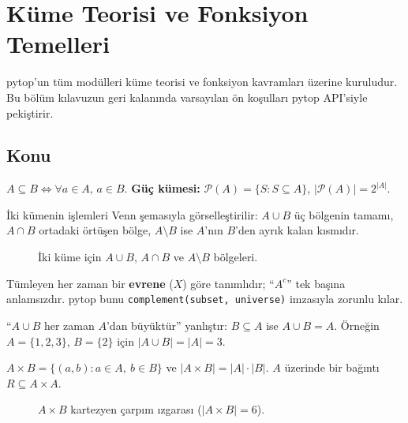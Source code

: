 \chapter{Küme Teorisi ve Fonksiyon Temelleri}

pytop'un tüm modülleri küme teorisi ve fonksiyon kavramları üzerine kuruludur.
Bu bölüm kılavuzun geri kalanında varsayılan ön koşulları pytop API'siyle pekiştirir.

\section{Konu}

\begin{definition}
$A \subseteq B \Longleftrightarrow \forall a \in A,\, a \in B$.
\textbf{Güç kümesi:} $\mathcal{P}(A) = \{S : S \subseteq A\}$,\quad
$|\mathcal{P}(A)| = 2^{|A|}$.
\end{definition}

İki kümenin işlemleri Venn şemasıyla görselleştirilir: $A\cup B$ üç bölgenin
tamamı, $A\cap B$ ortadaki örtüşen bölge, $A\setminus B$ ise $A$'nın $B$'den
ayrık kalan kısmıdır.

\begin{figure}[ht]
\centering

\caption{İki küme için $A\cup B$, $A\cap B$ ve $A\setminus B$ bölgeleri.}
\end{figure}

\begin{sezgi}
Tümleyen her zaman bir \textbf{evrene} ($X$) göre tanımlıdır; ``$A^c$'' tek
başına anlamsızdır. pytop bunu \texttt{complement(subset, universe)} imzasıyla
zorunlu kılar.
\end{sezgi}

\begin{karsiornek}
``$A\cup B$ her zaman $A$'dan büyüktür'' yanlıştır: $B\subseteq A$ ise
$A\cup B = A$. Örneğin $A=\{1,2,3\}$, $B=\{2\}$ için $|A\cup B|=|A|=3$.
\end{karsiornek}

\begin{definition}
$A \times B = \{(a,b) : a\in A,\ b\in B\}$ ve $|A\times B| = |A|\cdot|B|$.
$A$ üzerinde bir bağıntı $R \subseteq A\times A$.
\end{definition}

\begin{figure}[ht]
\centering

\caption{$A\times B$ kartezyen çarpım ızgarası ($|A\times B|=6$).}
\end{figure}


